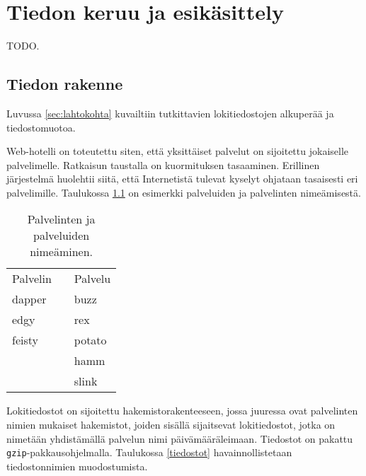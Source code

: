 
\chapter{Tiedon keruu ja esikäsittely}

TODO.


\section{Tiedon rakenne}

Luvussa \ref{sec:lahtokohta} kuvailtiin tutkittavien lokitiedostojen
alkuperää ja tiedostomuotoa.

Web-hotelli on toteutettu siten, että yksittäiset palvelut on
sijoitettu jokaiselle palvelimelle. Ratkaisun taustalla on
kuormituksen tasaaminen. Erillinen järjestelmä huolehtii siitä, että
Internetistä tulevat kyselyt ohjataan tasaisesti eri
palvelimille. Taulukossa \ref{nimet} on esimerkki palveluiden ja
palvelinten nimeämisestä.

\begin{table}[h]
\centering
\begin{tabular}{lll}
Palvelin && Palvelu \\
\cline{1-1}\cline{3-3}
dapper && buzz \\
edgy && rex \\
feisty && potato \\
&& hamm \\
&& slink \\
\end{tabular}
\caption{Palvelinten ja palveluiden nimeäminen.}
\label{nimet}
\end{table}

Lokitiedostot on sijoitettu hakemistorakenteeseen, jossa juuressa ovat
palvelinten nimien mukaiset hakemistot, joiden sisällä sijaitsevat
lokitiedostot, jotka on nimetään yhdistämällä palvelun nimi
päivämääräleimaan. Tiedostot on pakattu
\texttt{gzip}-pakkausohjelmalla. Taulukossa \ref{tiedostot}
havainnollistetaan tiedostonnimien muodostumista.

